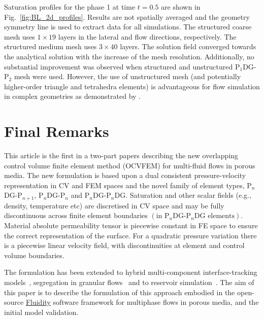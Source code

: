 \documentclass[preprint,authoryear,12pt]{elsarticle}
\newcommand{\PN}[2][error]{P$_{#1}$DG-P$_{#2}$}
\newcommand{\PNDG}[2][error]{P$_{#1}$DG-P$_{#2}$DG}
\begin{document}
Saturation profiles for the phase 1 at time $t=0.5$ are shown in Fig.~\ref{fig:BL_2d_profiles}. Results are not spatially averaged and the geometry symmetry line is used to extract data for all simulations. The structured coarse mesh uses $1 \times 19$ layers in the lateral and flow directions, respectively. The structured medium mesh uses $3 \times 40$ layers. The solution field converged towards the analytical solution with the increase of the mesh resolution. Additionally, no substantial improvement was observed when structured and unstructured \PN[1]{2} mesh were used. However, the use of unstructured mesh (and potentially higher-order triangle and tetrahedra elements) is advantageous for flow simulation in complex geometries as demonstrated by \citet{jackson_2013} \citep[also in][]{mostaghimi_2015}.


\section{Final Remarks}\label{conc}
This article is the first in a two-part papers describing the new overlapping control volume finite element method (OCVFEM) for multi-fluid flows in porous media. The new formulation is based upon a dual consistent pressure-velocity representation in CV and FEM spaces and the novel family of element types, \PN[n]{n+1}, \PN[n]{n} and \PNDG[n]{n}. Saturation and other scalar fields (e.g., density, temperature etc) are discretised in CV space and may be fully discontinuous across finite element boundaries $\left(\text{in \PNDG[n]{n} elements}\right)$. Material absolute permeability tensor is piecewise constant in FE space to ensure the correct representation of the surface. For a quadratic pressure variation there is a piecewise linear velocity field, with discontinuities at element and control volume boundaries.  

The formulation has been extended to hybrid multi-component interface-tracking models~\citep{pavlidis_2013b,pavlidis_2014,xie_2014}, segregation in granular flows~\citep{percival_2014} and to reservoir simulation~\citep{jackson_2013,mostaghimi_2015}. The aim of this paper is to describe the formulation of this approach embodied in the open-source \href{http://www3.imperial.ac.uk/earthscienceandengineering/research/amcg/fluidity}{Fluidity} software framework for multiphase flows in porous media, and the initial model validation.
\end{document}
